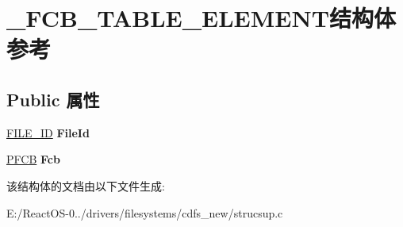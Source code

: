 \hypertarget{struct___f_c_b___t_a_b_l_e___e_l_e_m_e_n_t}{}\section{\+\_\+\+F\+C\+B\+\_\+\+T\+A\+B\+L\+E\+\_\+\+E\+L\+E\+M\+E\+N\+T结构体 参考}
\label{struct___f_c_b___t_a_b_l_e___e_l_e_m_e_n_t}
\subsection*{Public 属性}
\begin{DoxyCompactItemize}
\item 
\mbox{\label{struct___f_c_b___t_a_b_l_e___e_l_e_m_e_n_t_add5ef5d13bad0c87f4541848e94a9fd7}} 
\hyperlink{union___l_a_r_g_e___i_n_t_e_g_e_r}{F\+I\+L\+E\+\_\+\+ID} {\bfseries File\+Id}
\item 
\mbox{\label{struct___f_c_b___t_a_b_l_e___e_l_e_m_e_n_t_ab4469f62508a681cd0fdb73dd9b26863}} 
\hyperlink{struct___f_c_b}{P\+F\+CB} {\bfseries Fcb}
\end{DoxyCompactItemize}


该结构体的文档由以下文件生成\+:\begin{DoxyCompactItemize}
\item 
E\+:/\+React\+O\+S-\/0../drivers/filesystems/cdfs\+\_\+new/strucsup.\+c\end{DoxyCompactItemize}
